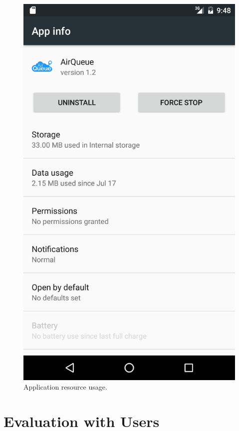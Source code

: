 \begin{figure}[H]
\begin{adjustbox}{width=.45\textwidth,center=\textwidth}
  \centering
  \includegraphics[scale=1]{images/resource_usage.png}
\end{adjustbox}
  \caption[Application resource usage]{Application resource usage.}
  \label{fig:automated_tests}
\end{figure}


\section{Evaluation with Users}

